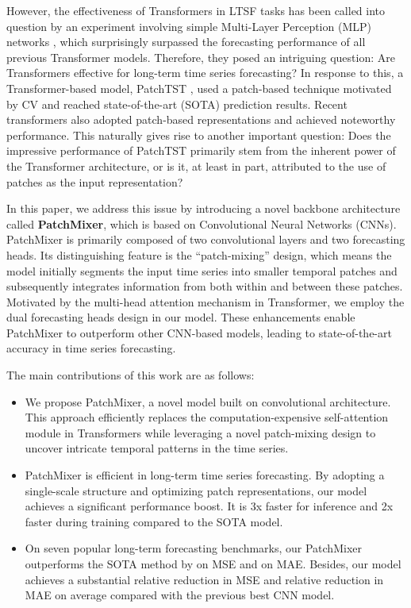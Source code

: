 \documentclass{article} \usepackage{iclr2024_conference,times}
\begin{document}
However, the effectiveness of Transformers in LTSF tasks has been called into question by an experiment involving simple Multi-Layer Perception (MLP) networks \citep{dlinear}, which surprisingly surpassed the forecasting performance of all previous Transformer models. 
Therefore, they posed an intriguing question: Are Transformers effective for long-term time series forecasting? 
In response to this, a Transformer-based model, PatchTST \citep{patchtst}, used a patch-based technique motivated by CV and reached state-of-the-art (SOTA) prediction results. 
Recent transformers \citep{crossformer, petformer} also adopted patch-based representations and achieved noteworthy performance. This naturally gives rise to another important question: Does the impressive performance of PatchTST primarily stem from the inherent power of the Transformer architecture, or is it, at least in part, attributed to the use of patches as the input representation?


In this paper, we address this issue by introducing a novel backbone architecture called \textbf{PatchMixer}, which is based on Convolutional Neural Networks (CNNs). PatchMixer is primarily composed of two convolutional layers and two forecasting heads. 
Its distinguishing feature is the ``patch-mixing'' design, which means the model initially segments the input time series into smaller temporal patches and subsequently integrates information from both within and between these patches. Motivated by the multi-head attention mechanism in Transformer, we employ the dual forecasting heads design in our model. These enhancements enable PatchMixer to outperform other CNN-based models, leading to state-of-the-art accuracy in time series forecasting.


The main contributions of this work are as follows:

\vspace{-5pt}
\begin{itemize}
  \item We propose PatchMixer, a novel model built on convolutional architecture. This approach efficiently replaces the computation-expensive self-attention module in Transformers while leveraging a novel patch-mixing design to uncover intricate temporal patterns in the time series.
  \item PatchMixer is efficient in long-term time series forecasting. By adopting a single-scale structure and optimizing patch representations, our model achieves a significant performance boost. It is 3x faster for inference and 2x faster during training compared to the SOTA model. 
  \item  On seven popular long-term forecasting benchmarks, our PatchMixer outperforms the
SOTA method by  on MSE and  on MAE. Besides, our model achieves a substantial  relative reduction in MSE and  relative reduction in MAE on average compared with the previous best CNN model.
\end{itemize}
\end{document}

